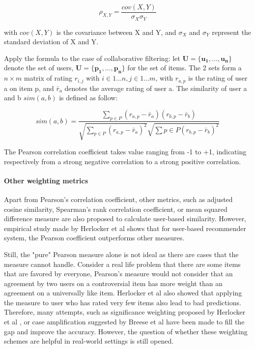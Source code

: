 \begin{displaymath}
\rho_{X,Y} = \frac{cov(X,Y)}{\sigma_X \sigma_Y}
\end{displaymath}

with \(cov(X,Y)\) is the covariance between X and Y, and \(\sigma_X\) and \(\sigma_Y\) represent the standard deviation of X and Y. 

Apply the formula to the case of collaborative filtering: let \( \mathbf{U} = \{ \mathbf{u_1}, \dots, \mathbf{u_n}\} \) denote the set of users, \( \mathbf{U} = \{ \mathbf{p_1}, \dots, \mathbf{p_n} \} \) for the set of items. The 2 sets form a \(n \times m\) matrix of rating \(r_{i,j}\) with \(i \in 1 \dots n, j \in 1 \dots m\), with \(r_{a,p} \) is the rating of user a on item p, and \(\bar{r}_a \) denotes the average rating of user a. The similarity of user a and b \(sim(a, b) \) is defined as follow:

\begin{displaymath}
sim(a,b) = \frac{\sum_{p \in P}(r_{a,p} - \bar{r}_a)(r_{b,p} - \bar{r}_b)}{\sqrt{\sum_{p \in P}(r_{a,p} - \bar{r}_a)^2} \sqrt{\sum{p \in P}(r_{b,p} - \bar{r}_b)^2}}
\end{displaymath}

The Pearson correlation coefficient takes value ranging from -1 to +1, indicating respectively from a strong negative correlation to a strong positive correlation.

\paragraph{Other weighting metrics}
Apart from Pearson's correlation coefficient, other metrics, such as adjusted cosine similarity, Spearman's rank correlation coefficient, or mean squared difference measure are also proposed to calculate user-based similarity. However, empirical study made by Herlocker et al \cite{herlocker1999algorithmic} shows that for user-based recommender system, the Pearson coefficient outperforms other measures.

Still, the "pure" Pearson measure alone is not ideal as there are cases that the measure cannot handle. Consider a real life problem that there are some items that are favored by everyone, Pearson's measure would not consider that an agreement by two users on a controversial item has more weight than an agreement on a universally like item. Herlocker et al \cite{herlocker1999algorithmic} also showed that applying the measure to user who has rated very few items also lead to bad predictions. Therefore, many attempts, such as significance weighting proposed by Herlocker et al \cite{herlocker1999algorithmic}, or case amplification suggested by Breese et al \cite{breese1998empirical} have been made to fill the gap and improve the accuracy. However, the question of whether these weighting schemes are helpful in real-world settings is still opened.

